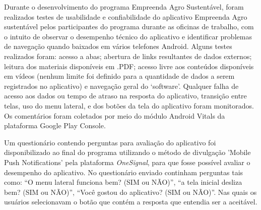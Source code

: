 Durante o desenvolvimento do programa Empreenda Agro Sustentável, foram realizados testes de usabilidade e confiabilidade do aplicativo Empreenda Agro sustentável pelos participantes do programa durante as oficinas de trabalho, com o intuito de observar o desempenho técnico do aplicativo e identificar problemas de navegação quando baixados em vários telefones Android. Alguns testes realizados foram: acesso a abas; abertura de links resultantes de dados externos; leitura dos materiais disponíveis em .PDF; acesso livre aos conteúdos disponíveis em vídeos (nenhum limite foi definido para a quantidade de dados a serem registrados no aplicativo) e navegação geral do ‘software’. Qualquer falha de acesso aos dados ou tempo de atraso na resposta do aplicativo, transição entre telas, uso do menu lateral, e dos botões da tela do aplicativo foram monitorados. Os comentários foram coletados por meio do módulo Android Vitals da plataforma Google Play Console.

Um questionário contendo perguntas para avaliação do aplicativo foi disponibilizado ao final do programa utilizando o método de divulgação 'Mobile Push Notifications' pela plataforma \textit{OneSignal}, para que fosse possível avaliar o desempenho do aplicativo. No questionário enviado continham perguntas tais como: “O menu lateral funciona bem? (SIM ou NÃO)”, “a tela inicial desliza bem? (SIM ou NÃO)”, “Você gostou do aplicativo? (SIM ou NÃO)”. Nas quais os usuários selecionavam o botão que contém a resposta que entendia ser a aceitável.







